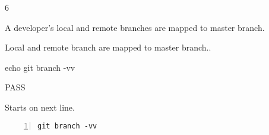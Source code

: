 \begin{description}[align=right,leftmargin=3.2cm,labelindent=3.0cm]
\item[Step:] 6
\item[Confirm:] A developer's local and remote branches are mapped to master branch.
\item[Expectation:] Local and remote branch are mapped to master branch..
\item[Command:] echo git  branch -vv
\item[Test Result:] PASS
\item[Evidence:] Starts on next line.
\end{description}
\begin{lstlisting}[numbers=left]
git branch -vv

\end{lstlisting}
